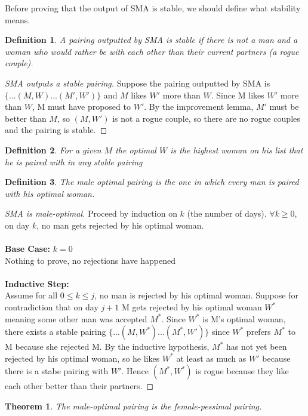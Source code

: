 \documentclass{article}
\newtheorem{theorem}{Theorem}
\newtheorem{definition}{Definition}
\newtheorem{proof}{Proof}
\begin{document}
Before proving that the output of SMA is stable, we should define what stability means.
\begin{definition}
    A pairing outputted by SMA is stable if there is not a man and a woman 
    who would rather be with each other than their current partners (a rogue couple).
\end{definition}
\begin{proof}[SMA outputs a stable pairing]
    Suppose the pairing outputted by SMA is $\{...(M, W)...(M', W')\}$ and $M$
    likes $W'$ more than $W$. Since M likes $W'$ more than $W$, M must have proposed
    to $W'$. By the improvement lemma, $M'$ must be better than $M$, so $(M, W')$ is not
    a rogue couple, so there are no rogue couples and the pairing is stable.
\end{proof}
\begin{definition}
    For a given $M$ the optimal $W$ is the highest woman on his list that he is paired with
    in any stable pairing
\end{definition}
\begin{definition}
    The male optimal pairing is the one in which every man is paired with his optimal woman.
\end{definition}
\begin{proof}[SMA is male-optimal]
    Proceed by induction on $k$ (the number of days). $\forall k \ge 0$, on day $k$, no man gets rejected by his optimal woman.\\\\
    \textbf{Base Case: } $k=0$
    \\Nothing to prove, no rejections have happened\\\\
    \textbf{Inductive Step: }\\
    Assume for all $0 \le k \le j$, no man is rejected by his optimal woman. Suppose for contradiction
    that on day $j+1$ M gets rejected by his optimal woman $W^*$ meaning some other man was accepted $M^*$.
    Since $W^*$ is M's optimal woman, there exists a stable pairing $\{...(M, W^*)...(M^*, W')\}$
    since $W^*$ prefers $M^*$ to M because she rejected M. By the inductive hypothesis, $M^*$ has not yet
    been rejected by his optimal woman, so he likes $W^*$ at least as much as $W'$ because there is a stabe
    pairing with $W'$. Hence $(M^*, W^*)$ is rogue because they like each other better than their partners.
\end{proof}
\begin{theorem}
    The male-optimal pairing is the female-pessimal pairing.
\end{theorem}
\end{document}
